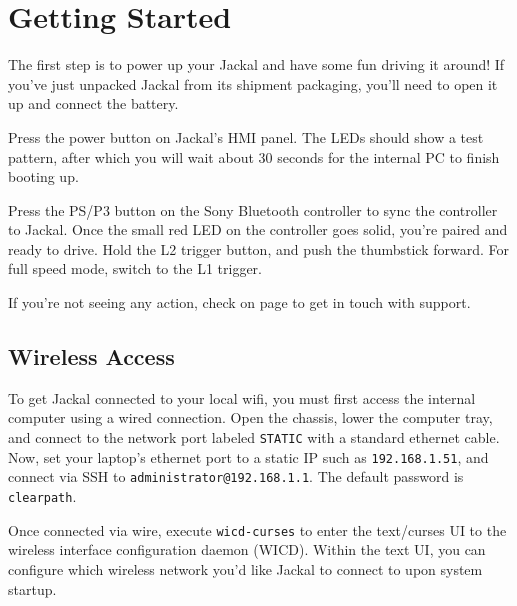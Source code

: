 \documentclass[]{clearpath-manual}
\begin{document}
\section{Getting Started}

The first step is to power up your Jackal and have some fun driving it around! If you've
just unpacked Jackal from its shipment packaging, you'll need to open it up and connect the
battery.

Press the power button  on
Jackal's HMI panel. The LEDs should show a test pattern, after which you will wait about 30
seconds for the internal PC to finish booting up.

  
Press the PS/P3 button on the Sony Bluetooth controller to sync the controller to Jackal. Once
the small red LED on the controller goes solid, you're paired and ready to drive. Hold the L2 trigger
button, and push the thumbstick forward. For full speed mode, switch to the L1 trigger.

If you're not seeing any action, check  on page \pageref{trouble} to
get in touch with support.

\subsection{Wireless Access}

To get Jackal connected to your local wifi, you must first access the internal computer
using a wired connection. Open the chassis, lower the computer tray, and connect to the network port
labeled \lstinline{STATIC} with a standard ethernet cable. Now, set your laptop's ethernet port
to a static IP such as \lstinline{192.168.1.51}, and connect via SSH to
\lstinline{administrator@192.168.1.1}. The default password is \lstinline{clearpath}.

Once connected via wire, execute \lstinline{wicd-curses} to enter the text/curses UI to the
wireless interface configuration daemon (WICD). Within the text UI, you can configure
which wireless network you'd like Jackal to connect to upon system startup.
\end{document}
